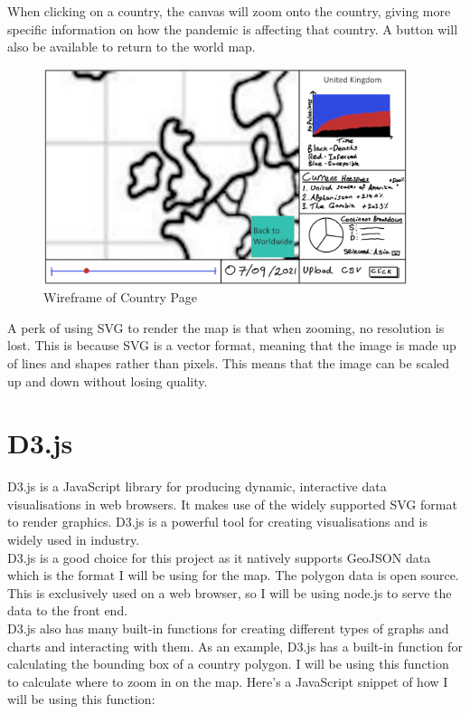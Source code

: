 \documentclass{report}
\begin{document}
When clicking on a country, the canvas will zoom onto the country, giving more specific information on how the pandemic is affecting that country. A button will also be available to return to the world map.
\begin{center}
    \begin{figure}[h]
        \centering
        \includegraphics[width=0.95\textwidth]{Images/Country_Wireframe.png}
        \caption{Wireframe of Country Page}
        \label{fig:wireframe_country}
    \end{figure}
\end{center}
A perk of using SVG to render the map is that when zooming, no resolution is lost. This is because SVG is a vector format, meaning that the image is made up of lines and shapes rather than pixels. This means that the image can be scaled up and down without losing quality.
\section{D3.js}
D3.js is a JavaScript library for producing dynamic, interactive data visualisations in web browsers. It makes use of the widely supported SVG format to render graphics. D3.js is a powerful tool for creating visualisations and is widely used in industry.\\

D3.js is a good choice for this project as it natively supports GeoJSON data which is the format I will be using for the map. The polygon data is open source. \cite{geojsonvectormaps}\\

This is exclusively used on a web browser, so I will be using node.js to serve the data to the front end.\\

D3.js also has many built-in functions for creating different types of graphs and charts and interacting with them. As an example, D3.js has a built-in function for calculating the bounding box of a country polygon. I will be using this function to calculate where to zoom in on the map. Here's a JavaScript snippet of how I will be using this function:
\end{document}
